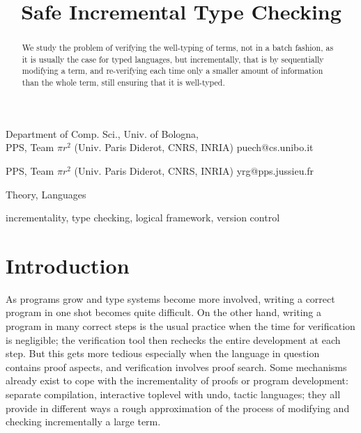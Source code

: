\documentclass[9pt]{sigplanconf}
\begin{document}
\copyrightdata{[to be supplied]} 


\title{Safe Incremental Type Checking}

           {Department of Comp. Sci., Univ. of Bologna,\\
             PPS, Team $\pi r^2$ (Univ. Paris Diderot, CNRS, INRIA)}
           {puech@cs.unibo.it}

           {PPS, Team $\pi r^2$ (Univ. Paris Diderot, CNRS, INRIA)}
           {yrg@pps.jussieu.fr}

\maketitle

\begin{abstract}
  We study the problem of verifying the well-typing of terms, not in a
  batch fashion, as it is usually the case for typed languages, but
  incrementally, that is by sequentially modifying a term, and
  re-verifying each time only a smaller amount of information than the
  whole term, still ensuring that it is well-typed.
\end{abstract}

 

\terms
Theory, Languages

\keywords
incrementality, type checking, logical framework, version control

\section{Introduction}

As programs grow and type systems become more involved, writing a
correct program in one shot becomes quite difficult. On the other
hand, writing a program in many correct steps is the usual practice
when the time for verification is negligible; the verification tool
then rechecks the entire development at each step. But this gets more
tedious especially when the language in question contains proof
aspects, and verification involves proof search. Some mechanisms
already exist to cope with the incrementality of proofs or program
development: separate compilation, interactive toplevel with undo,
tactic languages; they all provide in different ways a rough
approximation of the process of modifying and checking incrementally a
large term.
\end{document}
